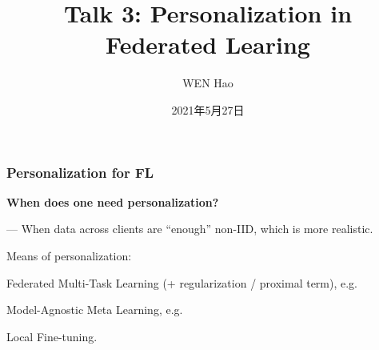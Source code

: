 


\title[Personalization]{Talk 3: Personalization in Federated Learing}
\date{2021年5月27日}
\author[]{WEN Hao}




\setlength{\belowdisplayskip}{5pt} \setlength{\belowdisplayshortskip}{5pt}
\setlength{\abovedisplayskip}{5pt} \setlength{\abovedisplayshortskip}{5pt}


\begin{frame}
\titlepage %
\end{frame}

\begin{frame}
\frametitle{Personalization for FL}

{\bfseries When does one need personalization?}

\vspace{0.2em}
\noindent --- When data across clients are ``enough'' non-IID, which is more realistic.

\pause
\vspace{0.8em}

Means of personalization:
\begin{itemize}
    \item Federated Multi-Task Learning (+ regularization / proximal term), e.g. \cite{smith2017mocha}
    {
    \item Model-Agnostic Meta Learning, e.g. \cite{finn2017maml}
    \item Local Fine-tuning.}
\end{itemize}

\end{frame}

